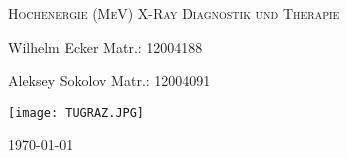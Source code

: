 \label{sec:Titelblatt}

\begin{titlepage}
    \centering
    \vspace{6cm}
    {\scshape\Large Hochenergie (MeV) X-Ray Diagnostik und Therapie \par}
    \vspace{3cm}
    {\Large Wilhelm Ecker Matr.: 12004188 \par } 
    {\Large Aleksey Sokolov Matr.: 12004091 \par}
    \vspace{2cm}
    {\texttt{[image: TUGRAZ.JPG]}\par}
    
    \vfill
    {\large \today\par} 
\end{titlepage}